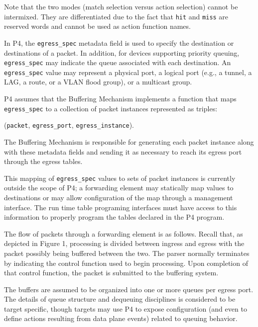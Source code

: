 \documentclass[12pt]{article}
\begin{document}
Note that the two modes (match selection versus action selection) cannot be
intermixed. They are differentiated due to the fact that \texttt{hit} and
\texttt{miss} are reserved words and cannot be used as action function names.



In P4, the \texttt{egress_spec} metadata field is used to specify the destination 
or destinations of a packet. In addition, for devices supporting priority 
queuing, \texttt{egress_spec} may indicate the queue associated with each destination. 
An \texttt{egress_spec} value may represent a physical port, a logical port (e.g., 
a tunnel, a LAG, a route, or a VLAN flood group), or a multicast group.

P4 assumes that the Buffering Mechanism implements a function that maps \texttt{egress_spec} to 
a collection of packet instances represented as triples:

\centerline{(\texttt{packet}, \texttt{egress_port}, \texttt{egress_instance}).}

The Buffering Mechanism is responsible for generating 
each packet instance along with these metadata fields and sending it as necessary 
to reach its egress port through the egress \matchaction tables. 

This mapping of \texttt{egress_spec} values to sets of packet instances is currently 
outside the scope of P4; a forwarding element may statically map values to 
destinations or may allow configuration of the map through a management interface. 
The run time table programing interfaces must have access to this information 
to properly program the tables declared in the P4 program.

The flow of packets through a forwarding element is as follows. Recall that, 
as depicted in Figure 1, processing is divided between ingress and egress 
with the packet possibly being buffered between the two. The parser normally 
terminates by indicating the control function used to begin processing.  Upon 
completion of that control function, the packet is submitted to the buffering 
system.

The buffers are assumed to be organized into one or more queues per egress 
port. The details of queue structure and dequeuing disciplines is considered 
to be target specific, though targets may use P4 to expose configuration (and 
even to define actions resulting from data plane events) related to queuing 
behavior.
\end{document}
